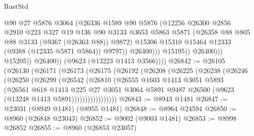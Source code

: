 \begin{lexlean}{RustStd}
\begin{coremodule}
                                @90
                                @27
                                @5876
                                @3064
                                (@26336
                                  @1589
                                  @90
                                  @5876
                                  (@12256
                                    @26300
                                    @2856
                                    @2910
                                    @223
                                    @327
                                    @19
                                    @136
                                    @90
                                    @3133
                                    @3653
                                    @5863
                                    @5871
                                    (@26358 @88 @805 @88 @3133 (@9367 (@26363 @88)) @9872)
                                    @15306
                                    @15310
                                    @15464
                                    @12333
                                    (@9388 (@12335 @5871 @5864))
                                    @9797))
                                @26400)))
                          @15195))
                      @26400)))
                @15205))
            @26400))
        (@9623 (@13223 @1413 @3566))))
@26842 := @26105
    (@26130
      (@26171
        (@26173
          (@26175
            (@26192
              (@26208
                (@26225
                  (@26238
                    (@26246
                      (@26250
                        (@26299
                          (@26542
                            (@26810
                              (@26555
                                @1603
                                @1413
                                @3051
                                @5893
                                (@26561
                                  @618
                                  @1413
                                  @225
                                  @27
                                  @3051
                                  @3064
                                  @5891
                                  @9487
                                  @26500
                                  (@9623 (@13248 @1413 @5891)))))))))))))))))
@26843 := @8943 @1481
@26847 := @23031 (@8949 @1481) (@8955 @1481)
@26848 := @8964 @24594
@26850 := @8960 (@26848 @23043)
@26852 := @9002 (@9003 @1481)
@26853 := @8998 @26852
@26855 := @8960 (@26853 @23057)

\end{coremodule}
\end{lexlean}
